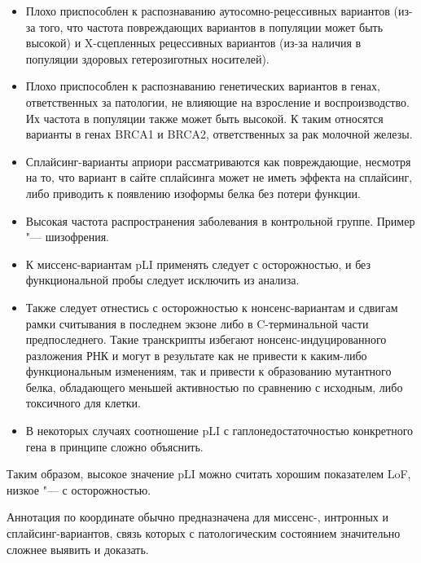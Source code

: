 \documentclass[a4paper,12pt]{article}
\begin{document}
\begin{enumerate}
\begin{itemize}
\item Плохо приспособлен к распознаванию аутосомно-рецессивных вариантов (из-за того, что частота повреждающих вариантов в популяции может быть высокой) и X-сцепленных рецессивных вариантов (из-за наличия в популяции здоровых гетерозиготных носителей).
\item Плохо приспособлен к распознаванию генетических вариантов в генах, ответственных за патологии, не влияющие на взросление и воспроизводство.
Их частота в популяции также может быть высокой.
К таким относятся варианты в генах BRCA1 и BRCA2, ответственных за рак молочной железы.
\item Сплайсинг-варианты априори рассматриваются как повреждающие, несмотря на то, что вариант в сайте сплайсинга может не иметь эффекта на сплайсинг, либо приводить к появлению изоформы белка без потери функции.
\item Высокая частота распространения заболевания в контрольной группе.
Пример "--- шизофрения.
\item К миссенс-вариантам pLI применять следует с осторожностью, и без функциональной пробы следует исключить из анализа.
\item Также следует отнестись с осторожностью к нонсенс-вариантам и сдвигам рамки считывания в последнем экзоне либо в C-терминальной части предпоследнего.
Такие транскрипты избегают нонсенс-индуцированного разложения РНК и могут в результате как не привести к каким-либо функциональным изменениям, так и привести к образованию мутантного белка, обладающего меньшей активностью по сравнению с исходным, либо токсичного для клетки.
\item В некоторых случаях соотношение pLI с гаплонедостаточностью конкретного гена в принципе сложно объяснить.
\end{itemize}

Таким образом, высокое значение pLI можно считать хорошим показателем LoF, низкое "--- с осторожностью.                                                                                                       \end{enumerate}

Аннотация по координате обычно предназначена для миссенс-, интронных и сплайсинг-вариантов, связь которых с патологическим состоянием значительно сложнее выявить и доказать.
\end{document}
